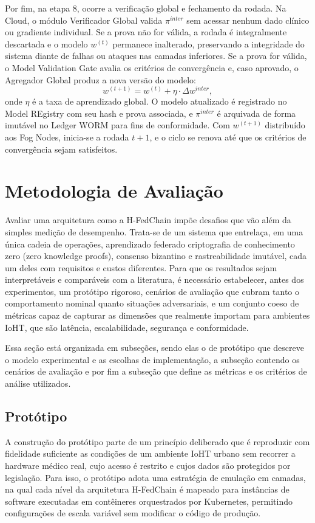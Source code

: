 \documentclass[12pt]{article}
\begin{document}
Por fim, na etapa 8, ocorre a verificação global e fechamento da rodada. Na Cloud, o módulo Verificador Global valida $\pi^{inter}$ sem acessar nenhum dado clínico ou gradiente individual. Se a prova não for válida, a rodada é integralmente descartada e o modelo $w^{(t)}$ permanece inalterado, preservando a integridade do sistema diante de falhas ou ataques nas camadas inferiores. Se a prova for válida, o Model Validation Gate avalia os critérios de convergência e, caso aprovado, o Agregador Global produz a nova versão do modelo:
\[
w^{(t+1)} = w^{(t)} + \eta \cdot \Delta w^{{inter}},
\]
onde $\eta$ é a taxa de aprendizado global. O modelo atualizado é registrado no Model REgistry com seu hash e prova associada, e $\pi^{inter}$ é arquivada de forma imutável no Ledger WORM para fins de conformidade. Com $w^{(t+1)}$ distribuído aos Fog Nodes, inicia-se a rodada $t+1$, e o ciclo se renova até que os critérios de convergência sejam satisfeitos.

\section{Metodologia de Avaliação}

Avaliar uma arquitetura como a H-FedChain impõe desafios que vão além da simples medição de desempenho. Trata-se de um sistema que entrelaça, em uma única cadeia de operações, aprendizado federado criptografia de conhecimento zero (zero knowledge proofs), consenso bizantino e rastreabilidade imutável, cada um deles com requisitos e custos diferentes. Para que os resultados sejam interpretáveis e comparáveis com a literatura, é necessário estabelecer, antes dos experimentos, um protótipo rigoroso, cenários de avaliação que cubram tanto o comportamento nominal quanto situações adversariais, e um conjunto coeso de métricas capaz de capturar as dimensões que realmente importam para ambientes IoHT, que são latência, escalabilidade, segurança e conformidade.

Essa seção está organizada em subseções, sendo elas o de protótipo que descreve o modelo experimental e as escolhas de implementação, a subseção contendo os cenários de avaliação e por fim a subseção que define as métricas e os critérios de análise utilizados.

\subsection{Protótipo}

A construção do protótipo parte de um princípio deliberado que é reproduzir com fidelidade suficiente as condições de um ambiente IoHT urbano sem recorrer a hardware médico real, cujo acesso é restrito e cujos dados são protegidos por legislação. Para isso, o protótipo adota uma estratégia de emulação em camadas, na qual cada nível da arquitetura H-FedChain é mapeado para instâncias de software executadas em contêineres orquestrados por Kubernetes, permitindo configurações de escala variável sem modificar o código de produção.
\end{document}
